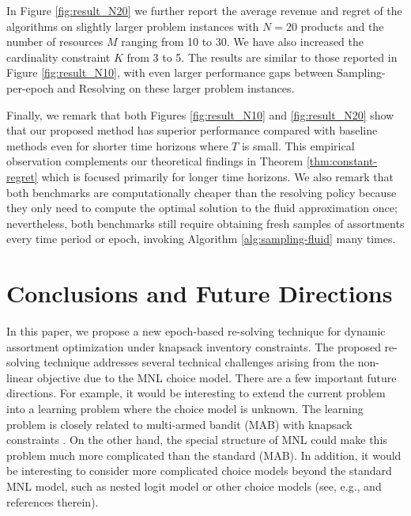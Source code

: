\documentclass[opre]{informs3aa}
\begin{document}
In Figure \ref{fig:result_N20} we further report the average revenue and regret of the algorithms on slightly larger problem instances with $N=20$ products
and the number of resources $M$ ranging from 10 to 30. We have also increased the cardinality constraint $K$ from 3 to 5.
The results are similar to those reported in Figure \ref{fig:result_N10}, with even larger performance gaps between \textsf{Sampling-per-epoch} and \textsf{Resolving} on these larger problem instances.


Finally, we remark that both Figures \ref{fig:result_N10} and \ref{fig:result_N20} show that our proposed method has superior performance compared with baseline methods even for shorter time horizons where $T$ is small. This empirical observation complements our theoretical findings in Theorem \ref{thm:constant-regret}
which is focused primarily for longer time horizons.
{We also remark that both benchmarks are computationally cheaper than the resolving policy because they only need to compute the optimal solution to the fluid approximation once;
nevertheless, both benchmarks still require obtaining fresh samples of assortments every time period or epoch, invoking Algorithm \ref{alg:sampling-fluid} many times.
}

\section{Conclusions and Future Directions}
\label{sec:conclusion}

In this paper, we propose a new epoch-based re-solving technique for dynamic assortment optimization under knapsack inventory constraints. The proposed re-solving technique addresses several technical challenges arising from the non-linear objective due to the MNL choice model.
There are a few important future directions. For example, it would be interesting to extend the current problem into a learning problem where the choice model is unknown. The learning problem is closely related to multi-armed bandit (MAB) with knapsack constraints \citep{badanidiyuru2018bandits}. On the other hand, the special structure of MNL could make this problem much more complicated than the standard (MAB). In addition, it would be interesting to consider more complicated choice models beyond the standard MNL model, such as nested logit model \citep{Williams77,McFadden1980} or other choice models (see, e.g., \cite{Farias2013,Desir2015} and references therein).
\end{document}
